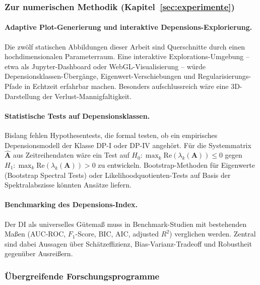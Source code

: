﻿\documentclass[12pt, a4paper]{article}
\theoremstyle{definition}
\theoremstyle{remark}
\newcommand{\vA}{\bm{A}}
\newcommand{\re}{\mathrm{Re}}
\begin{document}
\subsubsection{Zur numerischen Methodik (Kapitel~\ref{sec:experimente})}

\paragraph{Adaptive Plot-Generierung und interaktive Depensions-Explorierung.}
Die zwölf statischen Abbildungen dieser Arbeit sind Querschnitte durch einen
hochdimensionalen Parameterraum. Eine interaktive Explorations-Umgebung --
etwa als Jupyter-Dashboard oder WebGL-Visualisierung -- würde Depensions\-klassen-Übergänge,
Eigenwert-Verschiebungen und Regularisierungs-Pfade in Echtzeit erfahrbar machen.
Besonders aufschlussreich wäre eine 3D-Darstellung der Verlust-Mannigfaltigkeit.

\paragraph{Statistische Tests auf Depensionsklassen.}
Bislang fehlen Hypothesentests, die formal testen, ob ein empirisches Depensionsmodell
der Klasse DP-I oder DP-IV angehört. Für die Systemmatrix $\hat{\vA}$ aus Zeitreihendaten
wäre ein Test auf $H_0\colon \max_k\re(\lambda_k(\vA)) \leq 0$ gegen
$H_1\colon \max_k\re(\lambda_k(\vA)) > 0$ zu entwickeln. Bootstrap-Methoden
für Eigenwerte (Bootstrap Spectral Tests) oder Likelihoodquotienten-Tests
auf Basis der Spektralabszisse könnten Ansätze liefern.

\paragraph{Benchmarking des Depensions-Index.}
Der DI als universelles Gütemaß muss in Benchmark-Studien mit bestehenden
Maßen (AUC-ROC, $F_1$-Score, BIC, AIC, adjusted $R^2$) verglichen werden.
Zentral sind dabei Aussagen über Schätzeffizienz, Bias-Varianz-Tradeoff
und Robustheit gegenüber Ausreißern.

\subsubsection{Übergreifende Forschungsprogramme}
\end{document}
